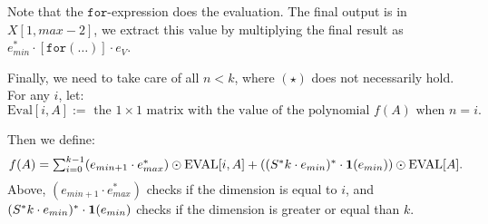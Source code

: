 Note that the $ \texttt{for}$-expression does the evaluation. The final output is in $X[1,max-2]$, we extract this value by multiplying the final result as $e_{min}^*\cdot [\texttt{for}(\ldots )]\cdot e_{V}$.

Finally, we need to take care of all $n<k$, where $(\star)$ does not necessarily hold. For any $i$, let: $$\text{Eval}[i,A]:= \text{ the } 1\times 1 \text{ matrix with the value of the polynomial } f(A) \text{ when } n=i.$$

Then we define: $$f(A)=\textstyle\sum_{i=0}^{k-1}(e_{min+1}\cdot e_{max}^*)\odot \text{EVAL}[i,A] + \left( (S^*k\cdot e_{min})^*\cdot \mathbf{1} (e_{min}) \right)\odot \text{EVAL}[A].$$ Above, $(e_{min+1}\cdot e_{max}^*)$ checks if the dimension is equal to $i$, and $(S^*k\cdot e_{min})^*\cdot \mathbf{1} (e_{min})$ checks if the dimension is greater or equal than $k$.












